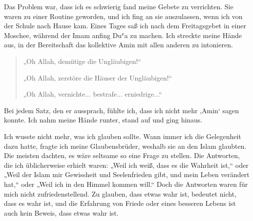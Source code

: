 \documentclass[12pt]{memoir}
\def\`{ʿ} %
\begin{document}
Das Problem war, dass ich es schwierig fand meine Gebete zu verrichten.
Sie waren zu einer Routine geworden,
und ich fing an sie auszulassen,
wenn ich von der Schule nach Hause kam.
Eines Tages saß ich nach dem Freitagsgebet in einer Moschee,
während der Imam anfing Du\`a zu machen.
Ich streckte meine Hände aus,
in der Bereitschaft das kollektive Amin mit allen anderen zu intonieren.

\begin{quote}
„Oh Allah, demütige die Ungläubigen!“

„Oh Allah, zerstöre die Häuser der Ungläubigen!“

„Oh Allah, vernichte... bestrafe... erniedrige...“
\end{quote}

Bei jedem Satz, den er aussprach,
fühlte ich, dass ich nicht mehr ‚Amin‘ sagen konnte.
Ich nahm meine Hände runter, stand auf und ging hinaus.

Ich wusste nicht mehr, was ich glauben sollte.
Wann immer ich die Gelegenheit dazu hatte,
fragte ich meine Glaubensbrüder,
weshalb sie an den Islam glaubten.
Die meisten dachten, es wäre seltsame so eine Frage zu stellen.
Die Antworten, die ich üblicherweise erhielt waren:
„Weil ich weiß, dass es die Wahrheit ist,“ oder
„Weil der Islam mir Gewissheit und Seelenfrieden gibt,
und mein Leben verändert hat,“ oder
„Weil ich in den Himmel kommen will.“
Doch die Antworten waren für mich nicht zufriedenstellend.
Zu glauben, dass etwas wahr ist, bedeutet nicht, dass es wahr ist,
und die Erfahrung von Friede oder eines besseren Lebens ist auch kein Beweis,
dass etwas wahr ist.
\end{document}
